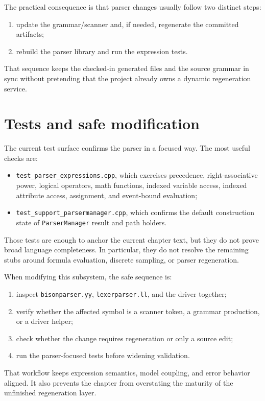 The practical consequence is that parser changes usually follow two distinct
steps:
\begin{enumerate}
\item update the grammar/scanner and, if needed, regenerate the committed
      artifacts;
\item rebuild the parser library and run the expression tests.
\end{enumerate}

That sequence keeps the checked-in generated files and the source grammar in
sync without pretending that the project already owns a dynamic regeneration
service.

\section{Tests and safe modification}
\label{sec:parser-tests}

The current test surface confirms the parser in a focused way. The most useful
checks are:
\begin{itemize}
\item \texttt{test\_parser\_expressions.cpp}, which exercises precedence,
      right-associative power, logical operators, math functions, indexed
      variable access, indexed attribute access, assignment, and event-bound
      evaluation;
\item \texttt{test\_support\_parsermanager.cpp}, which confirms the default
      construction state of \texttt{ParserManager} result and path holders.
\end{itemize}

Those tests are enough to anchor the current chapter text, but they do not
prove broad language completeness. In particular, they do not resolve the
remaining stubs around formula evaluation, discrete sampling, or parser
regeneration.

When modifying this subsystem, the safe sequence is:
\begin{enumerate}
\item inspect \texttt{bisonparser.yy}, \texttt{lexerparser.ll}, and the driver
      together;
\item verify whether the affected symbol is a scanner token, a grammar
      production, or a driver helper;
\item check whether the change requires regeneration or only a source edit;
\item run the parser-focused tests before widening validation.
\end{enumerate}

That workflow keeps expression semantics, model coupling, and error behavior
aligned. It also prevents the chapter from overstating the maturity of the
unfinished regeneration layer.
